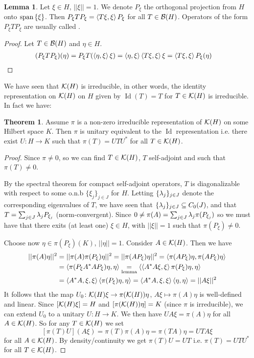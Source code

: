 \documentclass[10pt,english,a4paper]{article}
\theoremstyle{definition}
\newtheorem*{theorem}{Theorem}
\newtheorem*{lemma}{Lemma}
\let\emph\relax %
\DeclareMathOperator{\Id}{Id}
\begin{document}
\begin{lemma}
    Let $\xi \in H$, $||\xi||=1$. We denote $P_{\xi}$ the orthogonal projection from 
$H$ onto $\text{span} \left\{\xi\right\}$. Then 
$P_{\xi}TP_{\xi} = \left\langle T\xi,\xi \right\rangle P_{\xi}$ for all $T \in \mathcal{B}(H)$. Operators of the form $P_{\xi}TP_{\xi}$ are usually called \emph{compressions}.
\end{lemma}
\begin{proof}
    Let $T \in \mathcal{B}(H)$ and $\eta \in H$. 
\begin{align*}
    (P_{\xi}TP_{\xi})(\eta) &= P_{\xi}T(\left\langle \eta,\xi \right\rangle\xi) = \left\langle \eta,\xi \right\rangle\left\langle T\xi,\xi \right\rangle\xi
= \left\langle T\xi,\xi \right\rangle P_{\xi}(\eta)
\end{align*}
\end{proof}
We have seen that $\mathcal{K}(H)$ is irreducible, in other words, the identity representation 
on $\mathcal{K}(H)$ on $H$ given by $\Id(T) = T$ for $T \in \mathcal{K}(H)$ is irreducible. In fact we have:

\begin{theorem}
    Assume $\pi$ is a non-zero irreducible representation of $\mathcal{K}(H)$ on some
Hilbert space $K$. Then $\pi$ is unitary equivalent to the $\Id$ representation
i.e.  there exist $U\colon H\to K$ such that $\pi(T) = UTU^*$ for all $T\in
\mathcal{K}(H)$.
\end{theorem}
\begin{proof}
    Since $\pi\neq 0$, so we can find $T\in \mathcal{K}(H)$, $T$ self-adjoint and such that 
$\pi(T)\neq 0$.

By the spectral theorem for compact self-adjoint operators, $T$ is diagonalizable 
with respect to some o.n.b $\{\xi_j\}_{j\in J}$ for $H$. Letting
$\{\lambda_{j}\}_{j\in J}$ denote the corresponding eigenvalues of $T$, we have seen that 
$\{\lambda_j\}_{j\in J} \subseteq C_{0}(J)$, and that $T = \sum_{j\in J}\lambda_j P_{\xi_j}$
(norm-convergent). Since $0\neq\pi(A) = \sum_{j\in J}\lambda_j \pi(P_{\xi_j})$
so we must have that there exits (at least one) $\xi \in H$, with $||\xi||=1$
such that $\pi(P_{\xi})\neq 0$. 

Choose now $\eta \in \pi(P_{\xi})(K)$, $||\eta||=1$. Consider $A \in \mathcal{K}(H)$. 
Then we have 
\begin{align*}
||\pi(A)\eta||^2 &= ||\pi(A)\pi(P_{\xi})\eta||^2    
=||\pi(AP_{\xi})\eta||^2 = \left\langle \pi(AP_{\xi})\eta, \pi(AP_{\xi})\eta \right\rangle \\
&= \left\langle \pi(P_{\xi}A^*AP_{\xi})\eta, \eta \right\rangle
\underset{\text{lemma}}{=} \left\langle \left\langle A^*A\xi,\xi \right\rangle\pi(P_{\xi})\eta,\eta \right\rangle \\
&= \left\langle A^*A,\xi,\xi \right\rangle\left\langle \pi(P_{\xi})\eta,\eta \right\rangle =\left\langle A^*A,\xi,\xi \right\rangle\left\langle \eta,\eta \right\rangle
= ||A\xi||^2   
\end{align*}
It follows that the map $U_0\colon \mathcal{K}(H)\xi \to \pi(\mathcal{K}(H))\eta$, $A\xi\mapsto \pi(A)\eta$
is well-defined and linear. Since $[\mathcal{K}(H)\xi] = H$ and $[\pi(\mathcal{K}(H))\eta] = K$ (since $\pi$ is irreducible), we can extend $U_0$ to a unitary $U\colon H\to K$. We then have $UA\xi = \pi(A)\eta$
for all $A \in \mathcal{K}(H)$. So for any $T \in \mathcal{K}(H)$ we set 
\[ [\pi(T)U](A\xi) = \pi(T)\pi(A)\eta = \pi(TA)\eta = UTA\xi \]
for all $A \in \mathcal{K}(H)$.
By density/continuity we get $\pi(T)U = UT$ i.e. 
$\pi(T) = UTU^*$ for all $T \in \mathcal{K}(H)$.
\end{proof}
\end{document}

